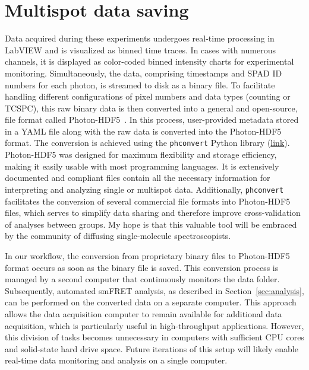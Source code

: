 \section{Multispot data saving}
\label{sec:data_saving}

Data acquired during these experiments undergoes real-time processing in LabVIEW and is visualized as binned time traces. 
In cases with numerous channels, it is displayed as color-coded binned intensity charts for experimental monitoring. 
Simultaneously, the data, comprising timestamps and \ac{SPAD} ID numbers for each photon, is streamed to disk as a binary file. 
To facilitate handling different configurations of pixel numbers and data types (counting or \ac{TCSPC}), this raw binary data is then converted into a general and open-source, file format called Photon-HDF5~\cite{ingargiola_BJ_2016, ingargiola_SPIE_2016}. 
In this process, user-provided metadata stored in a YAML file along with the raw data is converted into the Photon-HDF5 format. 
The conversion is achieved using the \texttt{phconvert} Python library (\href{https://photon-hdf5.github.io/phconvert/}{link}). 
Photon-HDF5 was designed for maximum flexibility and storage efficiency, making it easily usable with most programming languages.
It is extensively documented and compliant files contain all the necessary information for interpreting and analyzing single or multispot data. 
Additionally, \texttt{phconvert} facilitates the conversion of several commercial file formats into Photon-HDF5 files, which serves to simplify data sharing and therefore improve cross-validation of analyses between groups.
My hope is that this valuable tool will be embraced by the community of diffusing single-molecule spectroscopists. 

In our workflow, the conversion from proprietary binary files to Photon-HDF5 format occurs as soon as the binary file is saved. 
This conversion process is managed by a second computer that continuously monitors the data folder. 
Subsequently, automated \ac{smFRET} analysis, as described in Section~\ref{sec:analysis}, can be performed on the converted data on a separate computer.  
This approach allows the data acquisition computer to remain available for additional data acquisition, which is particularly useful in high-throughput applications. 
However, this division of tasks becomes unnecessary in computers with sufficient CPU cores and solid-state hard drive space.
Future iterations of this setup will likely enable real-time data monitoring and analysis on a single computer.

